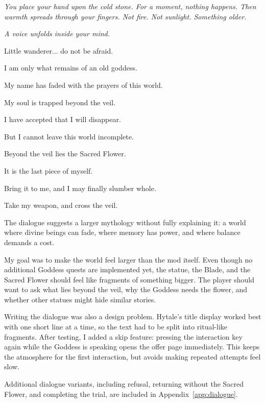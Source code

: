 \begin{tcolorbox}[
    title={First statue interaction},
    colback=gray!5,
    colframe=gray!60,
    arc=2mm,
    boxrule=0.5pt
]
    \textit{You place your hand upon the cold stone.
    For a moment, nothing happens.
    Then warmth spreads through your fingers.
    Not fire.
    Not sunlight.
    Something older.}

    \medskip

    \textit{A voice unfolds inside your mind.}

    \medskip

    Little wanderer... do not be afraid.

    I am only what remains of an old goddess.

    My name has faded with the prayers of this world.

    My soul is trapped beyond the veil.

    I have accepted that I will disappear.

    But I cannot leave this world incomplete.

    Beyond the veil lies the Sacred Flower.

    It is the last piece of myself.

    Bring it to me, and I may finally slumber whole.

    Take my weapon, and cross the veil.
\end{tcolorbox}

The dialogue suggests a larger mythology
without fully explaining it:
a world where divine beings can fade,
where memory has power,
and where balance demands a cost.

My goal was to make the world feel larger than the mod itself.
Even though no additional Goddess quests are implemented yet,
the statue,
the Blade,
and the Sacred Flower should feel like fragments of something bigger.
The player should want to ask what lies beyond the veil,
why the Goddess needs the flower,
and whether other statues might hide similar stories.


Writing the dialogue was also a design problem.
Hytale's title display worked best with one short line at a time,
so the text had to be split into ritual-like fragments.
After testing,
I added a skip feature:
pressing the interaction key again while the Goddess is speaking
opens the offer page immediately.
This keeps the atmosphere for the first interaction,
but avoids making repeated attempts feel slow.

Additional dialogue variants,
including refusal,
returning without the Sacred Flower,
and completing the trial,
are included in Appendix~\ref{app:dialogue}.


